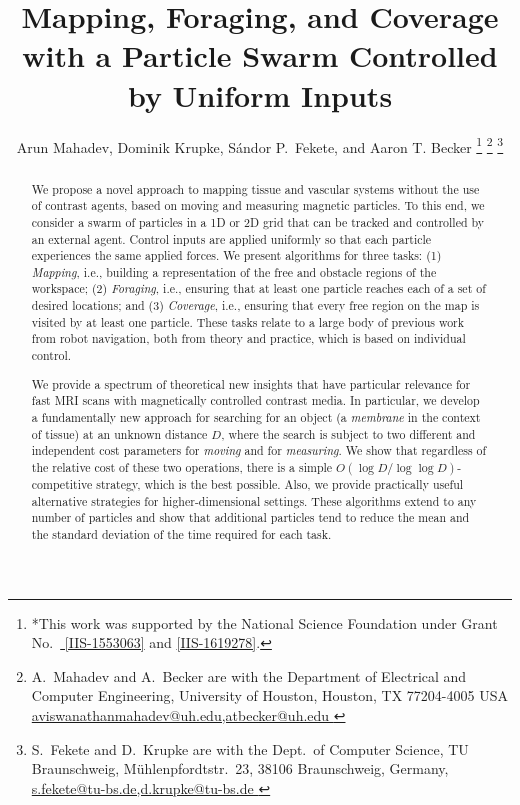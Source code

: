 \documentclass[letterpaper, 10 pt, conference]{ieeeconf}
\title{\LARGE \bf Mapping, Foraging, and Coverage\\ with a Particle Swarm Controlled by Uniform Inputs}
\author{Arun Mahadev, Dominik Krupke, S\'{a}ndor P.~Fekete, and Aaron T. Becker%
\thanks{*This work was supported by the National Science Foundation under Grant No.\ \href{http://nsf.gov/awardsearch/showAward?AWD_ID=1553063}{ [IIS-1553063]} and \href{http://nsf.gov/awardsearch/showAward?AWD_ID=1619278}{[IIS-1619278]}.}%
\thanks{A.~Mahadev and A.~Becker are with the Department of Electrical and Computer Engineering,  University of Houston, Houston, TX 77204-4005 USA 
      \protect\url{ aviswanathanmahadev@uh.edu,atbecker@uh.edu }}
\thanks{S.~Fekete and D.~Krupke are with the Dept.~of Computer Science, TU Braunschweig,  M\"uhlenpfordtstr.~23, 38106 Braunschweig, Germany,
      \protect\url{s.fekete@tu-bs.de,d.krupke@tu-bs.de  }
} %
}
\begin{document}
\maketitle
\thispagestyle{empty}
\pagestyle{empty}


\begin{abstract}
We propose a novel approach to mapping tissue and vascular systems without the use of contrast agents,
based on moving and measuring magnetic particles.
To this end, we consider a swarm of particles in a 1D or 2D grid that can be tracked and controlled by an external agent. 
Control inputs are applied uniformly so that each particle experiences the same applied forces. 
We present algorithms for three tasks: (1) {\em Mapping}, i.e., building a representation of the free and obstacle regions of the workspace;
(2) {\em Foraging}, i.e., ensuring that at least one particle reaches each of a set of desired locations; 
and (3) {\em Coverage}, i.e., ensuring that every free region on the map is visited by at least one particle.
These tasks relate to a large body of previous work from robot navigation, both from theory and practice, 
which is based on individual control.

We provide a spectrum of theoretical new insights 
that have particular relevance for fast MRI scans with magnetically controlled contrast media.
In particular, we develop a fundamentally new approach 
for searching for an object (a {\em membrane} in the context of tissue) at an unknown distance $D$, where the search is 
subject to two different and independent cost parameters
for {\em moving} and for {\em measuring}. We show that regardless of the relative cost of these two operations,
there is a simple $O(\log D/\log\log D)$-competitive strategy, which is the best possible.
Also, we provide practically useful
alternative strategies for higher-dimensional settings. 
These algorithms extend to any number of particles and show that additional particles tend to reduce the mean
and the standard deviation of the time required for each
task.



\end{abstract}
\end{document}
